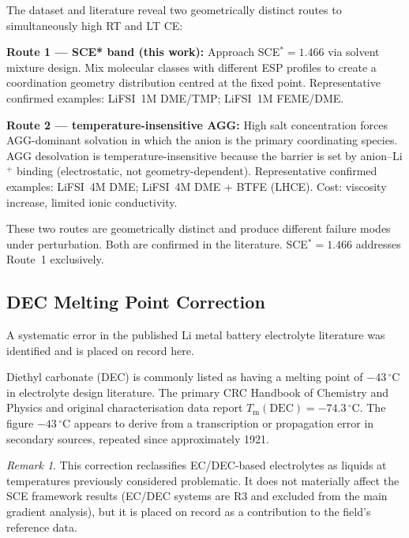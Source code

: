 \documentclass[11pt]{article}
\theoremstyle{plain}
\theoremstyle{definition}
\theoremstyle{remark}
\newtheorem{remark}{Remark}[section]
\begin{document}
The dataset and literature reveal two geometrically distinct routes to
simultaneously high RT and LT CE:

\medskip\noindent\textbf{Route 1 --- SCE* band (this work):}
Approach SCE$^{*} = 1.466$ via solvent mixture design.
Mix molecular classes with different ESP profiles to create a coordination
geometry distribution centred at the fixed point.
Representative confirmed examples: LiFSI~1M DME/TMP; LiFSI~1M FEME/DME.

\medskip\noindent\textbf{Route 2 --- temperature-insensitive AGG:}
High salt concentration forces AGG-dominant solvation in which the anion
is the primary coordinating species.  AGG desolvation is temperature-insensitive
because the barrier is set by anion--Li$^+$ binding (electrostatic, not
geometry-dependent).  Representative confirmed examples: LiFSI~4M DME;
LiFSI~4M DME + BTFE (LHCE).  Cost: viscosity increase, limited ionic conductivity.

These two routes are geometrically distinct and produce different failure modes
under perturbation.  Both are confirmed in the literature.  SCE$^{*} = 1.466$
addresses Route~1 exclusively.

\subsection{DEC Melting Point Correction}
\label{sec:DEC}

A systematic error in the published Li metal battery electrolyte literature
was identified and is placed on record here.

Diethyl carbonate (DEC) is commonly listed as having a melting point of
$-43\,^{\circ}$C in electrolyte design literature.  The primary CRC Handbook
of Chemistry and Physics \cite{CRC2024} and original characterisation data
report $T_{\mathrm{m}}(\mathrm{DEC}) = -74.3\,^{\circ}$C.  The figure
$-43\,^{\circ}$C appears to derive from a transcription or propagation error
in secondary sources, repeated since approximately 1921.

\begin{remark}
This correction reclassifies EC/DEC-based electrolytes as liquids at temperatures
previously considered problematic.  It does not materially affect the SCE
framework results (EC/DEC systems are R3 and excluded from the main gradient
analysis), but it is placed on record as a contribution to the field's reference
data.
\end{remark}

\end{document}
